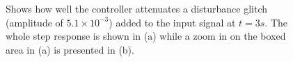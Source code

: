 \begin{figure}[h!]
  \centering %
  \qquad
  \caption{\label{fig:distrejection} Shows how well the controller attenuates a disturbance glitch (amplitude of $5.1 \times 10^{-3}$) added to the input signal at $t=3s$. The whole step response is shown in (a) while a zoom in on the boxed area in (a) is presented in (b).}
\end{figure}

